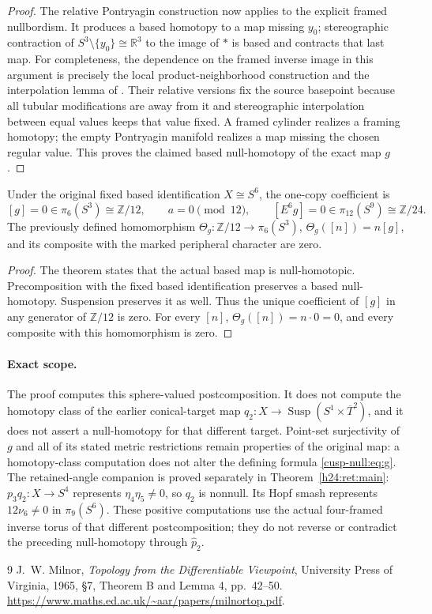 \begin{proof}
The relative Pontryagin construction now applies to the explicit
framed nullbordism. It produces a based homotopy to a map missing
\(y_0\); stereographic contraction of \(S^3\setminus\{y_0\}\cong\mathbb R^3\)
to the image of \(*\) is based and contracts that last map.
For completeness, the dependence on the framed inverse image in this
argument is precisely the local product-neighborhood construction and
the interpolation lemma of \cite[\S7, Theorem B and Lemma 4,
pp.~43, 48--50]{CuspNullMilnor1965}. Their relative versions fix the source
basepoint because all tubular modifications are away from it and
stereographic interpolation between equal values keeps that value
fixed. A framed cylinder realizes a framing homotopy; the empty
Pontryagin manifold realizes a map missing the chosen regular value.
This proves the claimed based null-homotopy of the exact map \(g\).
\end{proof}

\begin{corollary}
Under the original fixed based identification \(X\cong S^6\), the
one-copy coefficient is
\[
 [g]=0\in\pi_6(S^3)\cong\mathbb Z/12,\qquad a=0\pmod{12},\qquad
 [E^6g]=0\in\pi_{12}(S^9)\cong\mathbb Z/24.
\]
The previously defined homomorphism
\(\Theta_g:\mathbb Z/12\to\pi_6(S^3)\), \(\Theta_g([n])=n[g]\), and
its composite with the marked peripheral character are zero.
\end{corollary}
\begin{proof}
The theorem states that the actual based map is null-homotopic.
Precomposition with the fixed based identification preserves a based
null-homotopy. Suspension preserves it as well. Thus the unique
coefficient of \([g]\) in any generator of \(\mathbb Z/12\) is zero.
For every \([n]\), \(\Theta_g([n])=n\cdot0=0\), and every
composite with this homomorphism is zero.
\end{proof}

\paragraph{Exact scope.}
The proof computes this sphere-valued postcomposition. It does not
compute the homotopy class of the earlier conical-target map
\(q_2:X\to\operatorname{Susp}(S^1\times\overline T^2)\), and it
does not assert a null-homotopy for that different target. Point-set
surjectivity of \(g\) and all of its stated metric restrictions remain
properties of the original map: a homotopy-class computation does not
alter the defining formula \eqref{cusp-null:eq:g}.
The retained-angle companion is proved separately in
Theorem~\ref{h24:ret:main}: $p_3q_2:X\to S^4$ represents
$\eta_4\eta_5\ne0$, so $q_2$ is nonnull. Its Hopf smash
represents $12\nu_6\ne0$ in $\pi_9(S^6)$. These positive
computations use the actual four-framed inverse torus of that different
postcomposition; they do not reverse or contradict the preceding
null-homotopy through $\widehat p_2$.


\begin{thebibliography}{9}
J.~W. Milnor, \emph{Topology from the Differentiable Viewpoint},
University Press of Virginia, 1965, \S7, Theorem B and Lemma 4,
pp.~42--50. \url{https://www.maths.ed.ac.uk/~aar/papers/milnortop.pdf}.
\end{thebibliography}
